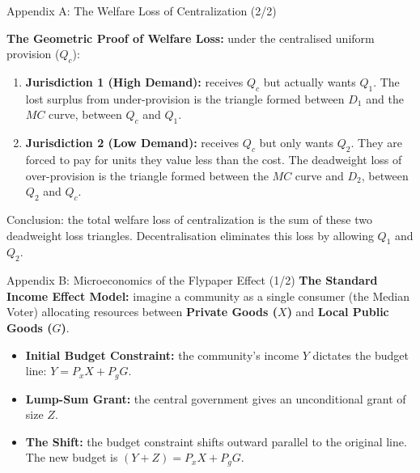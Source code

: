\documentclass[10pt]{beamer}
\begin{document}
\begin{frame}{Appendix A: The Welfare Loss of Centralization (2/2)}


\textbf{The Geometric Proof of Welfare Loss:}
under the centralised uniform provision ($Q_c$):
\begin{enumerate}
\item \textbf{Jurisdiction 1 (High Demand):} receives $Q_c$ but actually wants $Q_1$. The lost surplus from under-provision is the triangle formed between $D_1$ and the $MC$ curve, between $Q_c$ and $Q_1$.
\item \textbf{Jurisdiction 2 (Low Demand):} receives $Q_c$ but only wants $Q_2$. They are forced to pay for units they value less than the cost. The deadweight loss of over-provision is the triangle formed between the $MC$ curve and $D_2$, between $Q_2$ and $Q_c$.
\end{enumerate}

\alert{Conclusion:} the total welfare loss of centralization is the sum of these two deadweight loss triangles. Decentralisation eliminates this loss by allowing $Q_1$ and $Q_2$.
\end{frame}

\begin{frame}{Appendix B: Microeconomics of the Flypaper Effect (1/2)}
\textbf{The Standard Income Effect Model:}
imagine a community as a single consumer (the Median Voter) allocating resources between \textbf{Private Goods ($X$)} and \textbf{Local Public Goods ($G$)}.

\begin{itemize}
\item \textbf{Initial Budget Constraint:} the community's income $Y$ dictates the budget line: $Y = P_xX + P_gG$.
\item \textbf{Lump-Sum Grant:} the central government gives an unconditional grant of size $Z$.
\item \textbf{The Shift:} the budget constraint shifts outward parallel to the original line. The new budget is $(Y + Z) = P_xX + P_gG$.
\end{itemize}
\end{frame}
\end{document}
